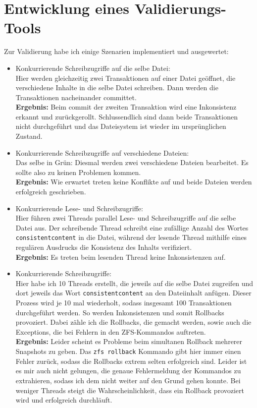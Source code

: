 \documentclass[12pt]{article}
\begin{document}
\section*{Entwicklung eines Validierungs-Tools}
Zur Validierung habe ich einige Szenarien implementiert und ausgewertet:
\begin{itemize}
	\item Konkurrierende Schreibzugriffe auf die selbe Datei:\\
	Hier werden gleichzeitig zwei Transaktionen auf einer Datei geöffnet, die verschiedene Inhalte in die selbe Datei schreiben.
	Dann werden die Transaktionen nacheinander committet.\\
	\textbf{Ergebnis:} Beim commit der zweiten Transaktion wird eine Inkonsistenz erkannt und zurückgerollt.
	Schlussendlich sind dann beide Transaktionen nicht durchgeführt und das Dateisystem ist wieder im ursprünglichen Zustand.
	
	\item Konkurrierende Schreibzugriffe auf verschiedene Dateien:\\
	Das selbe in Grün: Diesmal werden zwei verschiedene Dateien bearbeitet.
	Es sollte also zu keinen Problemen kommen.\\
	\textbf{Ergebnis:} Wie erwartet treten keine Konflikte auf und beide Dateien werden erfolgreich geschrieben.
	
	\item Konkurrierende Lese- und Schreibzugriffe:\\
	Hier führen zwei Threads parallel Lese- und Schreibzugriffe auf die selbe Datei aus.
	Der schreibende Thread schreibt eine zufällige Anzahl des Wortes \texttt{consistentcontent} in die Datei, während der lesende Thread mithilfe eines regulären Ausdrucks die Konsistenz des Inhalts verifiziert.\\
	\textbf{Ergebnis:} Es treten beim lesenden Thread keine Inkonsistenzen auf.
	
	\item Konkurrierende Schreibzugriffe:\\
	Hier habe ich 10 Threads erstellt, die jeweils auf die selbe Datei zugreifen und dort jeweils das Wort \texttt{consistentcontent} an den Dateiinhalt anfügen.
	Dieser Prozess wird je 10 mal wiederholt, sodass insgesamt 100 Transaktionen durchgeführt werden.
	So werden Inkonsistenzen und somit Rollbacks provoziert.
	Dabei zähle ich die Rollbacks, die gemacht werden, sowie auch die Exceptions, die bei Fehlern in den ZFS-Kommandos auftreten.\\
	\textbf{Ergebnis:} Leider scheint es Probleme beim simultanen Rollback mehrerer Snapshots zu geben.
	Das \texttt{zfs rollback} Kommando gibt hier immer einen Fehler zurück, sodass die Rollbacks extrem selten erfolgreich sind.
	Leider ist es mir auch nicht gelungen, die genaue Fehlermeldung der Kommandos zu extrahieren, sodass ich dem nicht weiter auf den Grund gehen konnte.
	Bei weniger Threads steigt die Wahrscheinlichkeit, dass ein Rollback provoziert wird und erfolgreich durchläuft.
\end{itemize}
\end{document}
